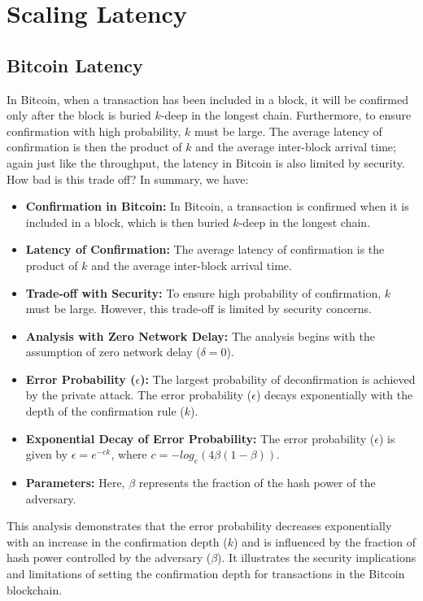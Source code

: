 \chapter{Scaling Latency}

\section{Bitcoin Latency}
In Bitcoin, when a transaction has been included in a block, it will be confirmed only after the block is buried $k$-deep in the longest chain. Furthermore, to ensure confirmation with high probability, $k$ must be large. The average latency of confirmation is then the product of $k$ and the average inter-block arrival time; again just like the throughput, the latency in Bitcoin is also limited by security. How bad is this trade oﬀ? In summary, we have:
\begin{itemize}
    \item \textbf{Confirmation in Bitcoin:} In Bitcoin, a transaction is confirmed when it is included in a block, which is then buried $k$-deep in the longest chain.
    \item \textbf{Latency of Confirmation:}  The average latency of confirmation is the product of $k$ and the average inter-block arrival time.
    \item \textbf{Trade-off with Security:} To ensure high probability of confirmation, $k$ must be large. However, this trade-off is limited by security concerns.
    \item \textbf{Analysis with Zero Network Delay:} The analysis begins with the assumption of zero network delay ($\delta = 0$).
    \item \textbf{Error Probability ($\epsilon$): }  The largest probability of deconfirmation is achieved by the private attack. The error probability ($\epsilon$) decays exponentially with the depth of the confirmation rule ($k$).
    \item  \textbf{Exponential Decay of Error Probability:} The error probability ($\epsilon$) is given by $\epsilon = e^{-ck}$, where $c = - log_{e}(4\beta(1 - \beta))$.
    \item \textbf{Parameters:} Here, $\beta$ represents the fraction of the hash power of the adversary.
\end{itemize}
This analysis demonstrates that the error probability decreases exponentially with an increase in the confirmation depth ($k$) and is influenced by the fraction of hash power controlled by the adversary ($\beta$). It illustrates the security implications and limitations of setting the confirmation depth for transactions in the Bitcoin blockchain.
